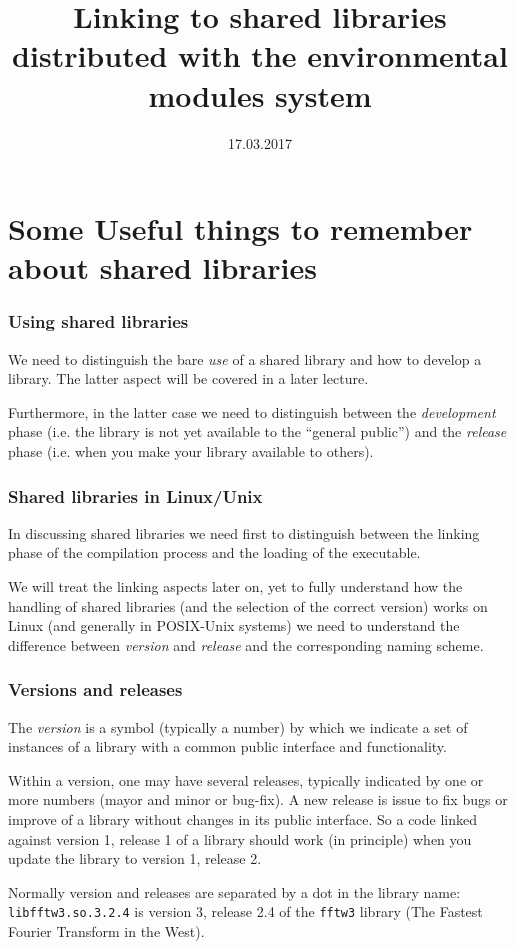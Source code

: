 \documentclass[9pt]{beamer}
\begin{document}
\title{Linking to shared libraries distributed with the environmental modules system}
\date{17.03.2017}

\begin{frame}
\maketitle
\end{frame}

\section{Some Useful things to remember about shared libraries}

\begin{frame}
\frametitle{Using shared libraries}
We need to distinguish the bare \emph{use} of a shared library and how
to develop a library. The latter aspect will be covered in a later lecture.
\medskip

Furthermore, in the latter case we need to distinguish between the
\emph{development} phase (i.e. the library is not yet available to the
``general public'') and the \emph{release} phase (i.e. when you make your
library available to others).
\end{frame}


\begin{frame}
  \frametitle{Shared libraries in Linux/Unix} In
  discussing shared libraries we need first to distinguish between the
  linking phase of the compilation process and the loading of the
  executable. 
\medskip

We will treat the linking aspects later on, yet to fully understand
how the handling of shared libraries (and the selection of the correct
version) works on Linux (and generally in POSIX-Unix systems) we need
to understand the difference between \emph{version} and \emph{release}
and the corresponding naming scheme.
\end{frame}

\begin{frame}
  \frametitle{Versions and releases} 
The \emph{version} is a symbol
  (typically a number) by which we indicate a set of instances of a
  library with \alert{a common public interface and functionality}.
  \smallskip

  Within a version, one may have several releases, typically indicated
  by one or more numbers (mayor and minor or bug-fix). A new release is 
  issue to fix bugs  or improve of a library \alert{without
    changes in its public interface}. So a code linked against version 1,
  release 1 of a library should work (in principle) when you update
  the library to version 1, release 2.
\smallskip

  Normally version and releases are separated by a dot in the library name:
  \texttt{libfftw3.so.3.2.4} is version 3, release 2.4 of the
  \texttt{fftw3} library (The Fastest Fourier Transform in the West).
\end{frame}
\end{document}
